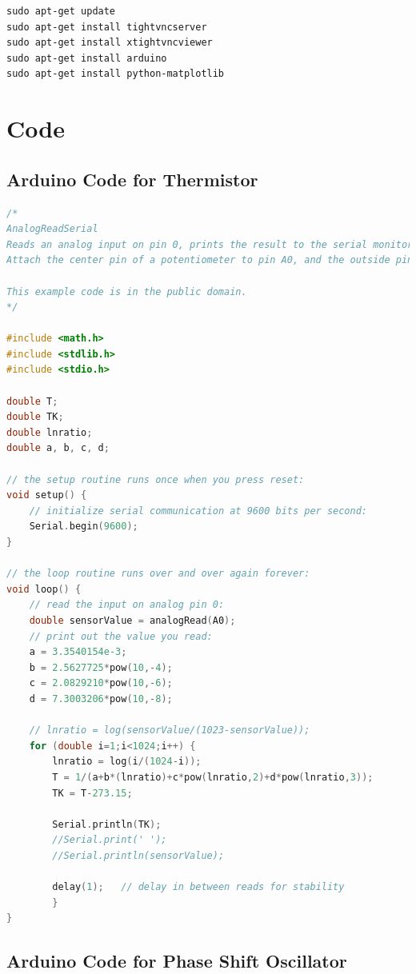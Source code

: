 \begin{lstlisting}
sudo apt-get update
sudo apt-get install tightvncserver
sudo apt-get install xtightvncviewer
sudo apt-get install arduino
sudo apt-get install python-matplotlib
\end{lstlisting}





\section{Code}

\subsection{Arduino Code for Thermistor}
\label{arduinothermistor}

\begin{lstlisting}[language=c]
/*
AnalogReadSerial
Reads an analog input on pin 0, prints the result to the serial monitor.
Attach the center pin of a potentiometer to pin A0, and the outside pins to +5V and ground.

This example code is in the public domain.
*/

#include <math.h>
#include <stdlib.h>
#include <stdio.h>

double T; 
double TK; 
double lnratio; 
double a, b, c, d; 

// the setup routine runs once when you press reset:
void setup() {
	// initialize serial communication at 9600 bits per second:
	Serial.begin(9600);
}

// the loop routine runs over and over again forever:
void loop() {
	// read the input on analog pin 0:
	double sensorValue = analogRead(A0);
	// print out the value you read:
	a = 3.3540154e-3;
	b = 2.5627725*pow(10,-4);
	c = 2.0829210*pow(10,-6);
	d = 7.3003206*pow(10,-8);
	
	// lnratio = log(sensorValue/(1023-sensorValue));
	for (double i=1;i<1024;i++) {
		lnratio = log(i/(1024-i));
		T = 1/(a+b*(lnratio)+c*pow(lnratio,2)+d*pow(lnratio,3)); 
		TK = T-273.15; 
		
		Serial.println(TK); 
		//Serial.print(' '); 
		//Serial.println(sensorValue);
		
		delay(1); 	// delay in between reads for stability
		}        
}
\end{lstlisting}

\subsection{Arduino Code for Phase Shift Oscillator}
\label{arduinopso}

